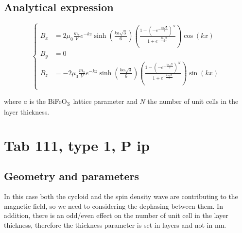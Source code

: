 \documentclass[a4paper,12pt]{article}
\newcommand{\BFO}{BiFeO\textsubscript{3}\ }
\begin{document}
\subsection{Analytical expression}

\begin{equation*}
    \left \lbrace
      \begin{aligned}
        B_x & = 2 \mu_0 \frac{m_s}{V} e^{-k z} \sinh \left(\frac{ka\sqrt{3}}{6}\right)
        \left(\frac{1-(-e^{-\frac{ka\sqrt{3}}{3}})^N}{1+e^{-\frac{ka\sqrt{3}}{3}}}\right) \cos(kx) \\
        B_y &= 0 \\
        B_z & = -2 \mu_0 \frac{m_s}{V} e^{-k z} \sinh\left( \frac{ka\sqrt{3}}{6}\right)
        \left( \frac{1-(-e^{-\frac{ka\sqrt{3}}{3}})^N}{1+e^{-\frac{ka\sqrt{3}}{3}}} \right) \sin(kx) \\ 
      \end{aligned}
    \right.
  \end{equation*}

  where $a$ is the \BFO lattice parameter and $N$ the number of unit cells in the layer thickness.

\clearpage
\section{Tab 111, type 1, P ip}
\subsection{Geometry and parameters}

In this case both the cycloid and the spin density wave are contributing to the magnetic field, so we need to considering the dephasing between them. In addition, there is an odd/even effect on the number of unit cell in the layer thickness, therefore the thickness parameter is set in layers and not in \si{\nano\meter}.

\vspace*{1em}
\end{document}
